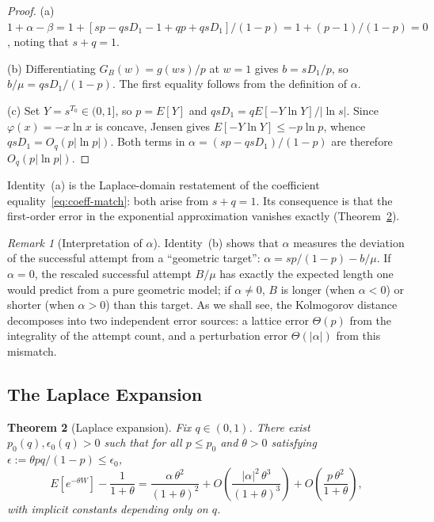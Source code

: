 \documentclass[11pt]{article}
\theoremstyle{plain}
\newtheorem{theorem}{Theorem}[section]
\theoremstyle{definition}
\theoremstyle{remark}
\newtheorem{remark}[theorem]{Remark}
\begin{document}
\begin{proof}
(a) $1 + \alpha - \beta = 1 + [sp - qsD_1 - 1 + qp + qsD_1]/(1-p) = 1 + (p-1)/(1-p) = 0$, noting that $s + q = 1$.

(b) Differentiating $G_B(w) = g(ws)/p$ at $w = 1$ gives $b = sD_1/p$, so $b/\mu = qsD_1/(1-p)$.  The first equality follows from the definition of $\alpha$.

(c) Set $Y = s^{T_0} \in (0,1]$, so $p = E[Y]$ and $qsD_1 = qE[-Y\ln Y]/|\ln s|$.  Since $\varphi(x) = -x\ln x$ is concave, Jensen gives $E[-Y\ln Y] \leq -p\ln p$, whence $qsD_1 = O_q(p|\ln p|)$.  Both terms in $\alpha = (sp - qsD_1)/(1-p)$ are therefore $O_q(p|\ln p|)$.
\end{proof}

Identity~(a) is the Laplace-domain restatement of the coefficient equality~\eqref{eq:coeff-match}: both arise from $s + q = 1$.  Its consequence is that the first-order error in the exponential approximation vanishes exactly (Theorem~\ref{thm:laplace}).






\begin{remark}[Interpretation of $\alpha$]\label{rem:alpha-interp}
Identity~(b) shows that $\alpha$ measures the deviation of the successful attempt from a ``geometric target'': $\alpha = sp/(1-p) - b/\mu$.  If $\alpha = 0$, the rescaled successful attempt $B/\mu$ has exactly the expected length one would predict from a pure geometric model; if $\alpha \neq 0$, $B$ is longer (when $\alpha < 0$) or shorter (when $\alpha > 0$) than this target.  As we shall see, the Kolmogorov distance decomposes into two independent error sources: a lattice error $\Theta(p)$ from the integrality of the attempt count, and a perturbation error $\Theta(|\alpha|)$ from this mismatch.
\end{remark}




\subsection{The Laplace Expansion}\label{sec:laplace}

\begin{theorem}[Laplace expansion]\label{thm:laplace}
Fix $q \in (0,1)$.  There exist $p_0(q), \epsilon_0(q) > 0$ such that for all $p \leq p_0$ and $\theta > 0$ satisfying $\epsilon := \theta pq/(1-p) \leq \epsilon_0$,
\begin{equation}\label{eq:laplace-expansion}
  E[e^{-\theta W}] - \frac{1}{1+\theta}
  = \frac{\alpha\,\theta^2}{(1+\theta)^2}
  + O\!\left(\frac{|\alpha|^2\,\theta^3}{(1+\theta)^3}\right)
  + O\!\left(\frac{p\,\theta^2}{1+\theta}\right),
\end{equation}
with implicit constants depending only on $q$.
\end{theorem}
\end{document}
